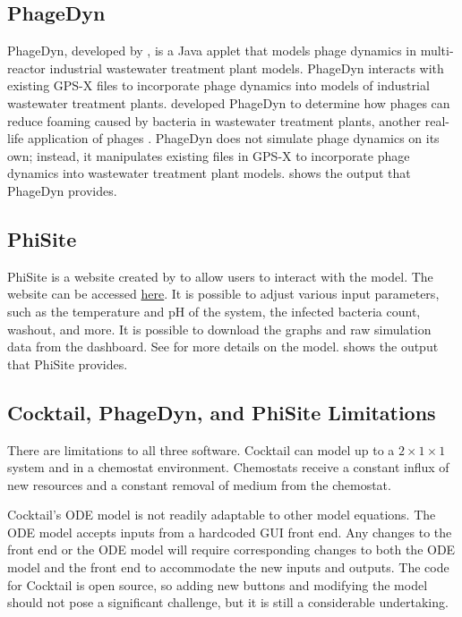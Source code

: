 \subsection{PhageDyn}
PhageDyn, developed by \cite{krysiak-baltynSimulationPhageDynamics2017}, is a Java applet that models phage dynamics in multi-reactor industrial wastewater treatment plant models. 
PhageDyn interacts with existing GPS-X \cite{AdvancedWastewaterModelling} files to incorporate phage dynamics into models of industrial wastewater treatment plants. 
\citet{krysiak-baltynSimulationPhageDynamics2017} developed PhageDyn to determine how phages can reduce foaming caused by bacteria in wastewater treatment plants, another real-life application of phages \cite{heardEffectFilamentousBacteria2008}. 
PhageDyn does not simulate phage dynamics on its own; instead, it manipulates existing files in GPS-X to incorporate phage dynamics into wastewater treatment plant models. 
 shows the output that PhageDyn provides. 

\subsection{PhiSite}
PhiSite is a website created by \citet{bekeModellingInteractionBacteriophages2016} to allow users to interact with the \citet{schragHostParasiteCoexistenceRole1996} model. 
The website can be accessed \href{http://dublin.embnet.sk:3838/model/}{here}. 
It is possible to adjust various input parameters, such as the temperature and pH of the system, the infected bacteria count, washout, and more. 
It is possible to download the graphs and raw simulation data from the dashboard.
See  for more details on the model. 
 shows the output that PhiSite provides. 

\subsection{Cocktail, PhageDyn, and PhiSite Limitations}
\label{sec:literature:cocktail_and_phagedyn_limitations}
There are limitations to all three software. 
Cocktail can model up to a $2\times 1 \times 1$ system and in a chemostat environment. 
Chemostats receive a constant influx of new resources and a constant removal of medium from the chemostat. 

Cocktail’s ODE model is not readily adaptable to other model equations.
The ODE model accepts inputs from a hardcoded GUI front end. 
Any changes to the front end or the ODE model will require corresponding changes to both the ODE model and the front end to accommodate the new inputs and outputs. 
The code for Cocktail is open source, so adding new buttons and modifying the model should not pose a significant challenge, but it is still a considerable undertaking. 

